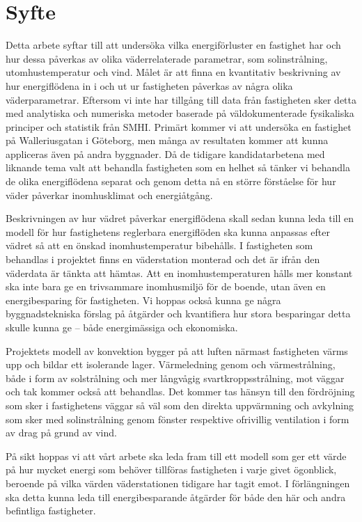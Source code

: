 \section{Syfte}
Detta arbete syftar till att undersöka vilka energiförluster en fastighet har och hur dessa 
påverkas av olika väderrelaterade parametrar, som solinstrålning, utomhustemperatur 
och vind. Målet är att finna en kvantitativ beskrivning av hur energiflödena in i och ut ur 
fastigheten påverkas av några olika väderparametrar. Eftersom vi inte har tillgång till data
 från fastigheten sker detta med analytiska och numeriska metoder baserade på 
väldokumenterade fysikaliska principer och statistik från SMHI. Primärt kommer vi att 
undersöka en fastighet på Walleriusgatan i Göteborg, men många av resultaten kommer 
att kunna appliceras även på andra byggnader. Då de tidigare kandidatarbetena med liknande tema valt att
behandla fastigheten som en helhet så tänker vi behandla de olika energiflödena separat
och genom detta nå en större förståelse för hur väder påverkar inomhusklimat och energiåtgång.

Beskrivningen av hur vädret påverkar energiflödena skall sedan kunna leda till en modell 
för hur fastighetens reglerbara energiflöden ska kunna anpassas efter vädret så att en 
önskad inomhustemperatur bibehålls. I fastigheten som behandlas i projektet finns
 en väderstation monterad och det är ifrån den väderdata är tänkta att hämtas. Att en inomhustemperaturen hålls mer konstant ska 
 inte bara ge en trivsammare inomhusmiljö för de boende, utan även en energibesparing 
 för fastigheten. Vi hoppas också kunna ge några byggnadstekniska förslag på åtgärder 
 och kvantifiera hur stora besparingar detta skulle kunna ge – både energimässiga och 
 ekonomiska.

Projektets modell av konvektion bygger på att luften närmast fastigheten värms upp och 
bildar ett isolerande lager. Värmeledning genom och värmestrålning, både i form av solstrålning och mer långvågig svartkroppsstrålning, mot väggar och tak kommer också att behandlas. Det kommer tas hänsyn till den fördröjning som 
sker i fastighetens väggar så väl som den direkta uppvärmning och avkylning som sker med 
solinstrålning genom fönster respektive ofrivillig ventilation i form av drag på grund av vind.

På sikt hoppas vi att vårt arbete ska leda fram till ett modell som ger ett värde på hur mycket energi som behöver tillföras fastigheten i varje givet ögonblick, beroende på vilka värden väderstationen tidigare har tagit emot. I förlängningen ska detta kunna leda till energibesparande åtgärder för både den här och andra befintliga fastigheter.
